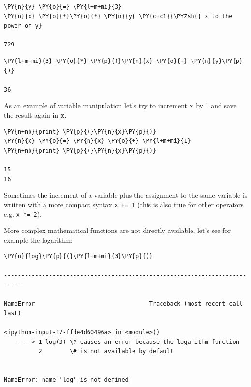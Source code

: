 \begin{codebox}[breakable, size=fbox, boxrule=1pt, pad at break*=1mm, colback=cellbackground, colframe=cellborder]            
\begin{Verbatim}[commandchars=\\\{\}]
\PY{n}{y} \PY{o}{=} \PY{l+m+mi}{3}
\PY{n}{x} \PY{o}{*}\PY{o}{*} \PY{n}{y} \PY{c+c1}{\PYZsh{} x to the power of y}

729
\end{Verbatim}
\end{codebox}

\begin{codebox}[breakable, size=fbox, boxrule=1pt, pad at break*=1mm, colback=cellbackground, colframe=cellborder]            
\begin{Verbatim}[commandchars=\\\{\}]
\PY{l+m+mi}{3} \PY{o}{*} \PY{p}{(}\PY{n}{x} \PY{o}{+} \PY{n}{y}\PY{p}{)}

36
\end{Verbatim}
\end{codebox}

As an example of variable manipulation let's try to increment \(\tt{x}\) by 1 and save the result again in \(\tt{x}\).

\begin{codebox}[breakable, size=fbox, boxrule=1pt, pad at break*=1mm, colback=cellbackground, colframe=cellborder]            
\begin{Verbatim}[commandchars=\\\{\}]
\PY{n+nb}{print} \PY{p}{(}\PY{n}{x}\PY{p}{)}
\PY{n}{x} \PY{o}{=} \PY{n}{x} \PY{o}{+} \PY{l+m+mi}{1}
\PY{n+nb}{print} \PY{p}{(}\PY{n}{x}\PY{p}{)}

15
16
\end{Verbatim}
\end{codebox}

Sometimes the increment of a variable plus the assignment to the same variable is written 
with a more compact syntax \texttt{x += 1} (this is also true for other operators e.g. \texttt{x *= 2}).

More complex mathematical functions are not directly available, let's see for example the logarithm:

\begin{codebox}[breakable, size=fbox, boxrule=1pt, pad at break*=1mm, colback=cellbackground, colframe=cellborder]            
\begin{Verbatim}[commandchars=\\\{\}]
\PY{n}{log}\PY{p}{(}\PY{l+m+mi}{3}\PY{p}{)}

---------------------------------------------------------------------------

NameError                                 Traceback (most recent call last)

<ipython-input-17-ffde4d60496a> in <module>()
    ----> 1 log(3) \# causes an error because the logarithm function
          2        \# is not available by default


NameError: name 'log' is not defined
\end{Verbatim}
\end{codebox}

